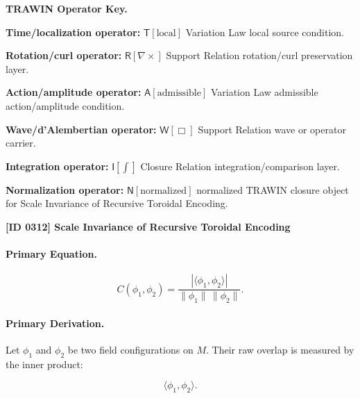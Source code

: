 \par\vspace{0.45\baselineskip}
\noindent\begin{minipage}[t]{\linewidth}
\begingroup
\small
\raggedright
\textbf{TRAWIN Operator Key.}\par
\noindent\textbf{Time/localization operator:} $\mathsf{T}\!\left[\mathrm{local}\right]$ Variation Law local source condition.\par
\noindent\textbf{Rotation/curl operator:} $\mathsf{R}\!\left[\nabla\times\right]$ Support Relation rotation/curl preservation layer.\par
\noindent\textbf{Action/amplitude operator:} $\mathsf{A}\!\left[\mathrm{admissible}\right]$ Variation Law admissible action/amplitude condition.\par
\noindent\textbf{Wave/d'Alembertian operator:} $\mathsf{W}\!\left[\Box\right]$ Support Relation wave or operator carrier.\par
\noindent\textbf{Integration operator:} $\mathsf{I}\!\left[\int\right]$ Closure Relation integration/comparison layer.\par
\noindent\textbf{Normalization operator:} $\mathsf{N}\!\left[\mathrm{normalized}\right]$ normalized TRAWIN closure object for Scale Invariance of Recursive Toroidal Encoding.\par
\endgroup
\end{minipage}

\clearpage
\noindent\textbf{[ID 0312] Scale Invariance of Recursive Toroidal Encoding}\par
\vspace{0.35em}
\paragraph{Primary Equation.}
\begin{equation}
C(\phi_1,\phi_2)
=
\frac{
\left|\langle \phi_1,\phi_2\rangle\right|
}{
\lVert \phi_1\rVert\,\lVert \phi_2\rVert
}.
\end{equation}

\paragraph{Primary Derivation.}
Let $\phi_1$ and $\phi_2$ be two field configurations on $M$.  
Their raw overlap is measured by the inner product:

\begin{equation}
\langle \phi_1,\phi_2\rangle .
\end{equation}

